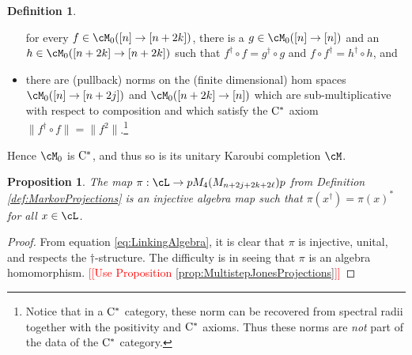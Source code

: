 \documentclass[11pt]{article}
\theoremstyle{plain}
\newtheorem{prop}[thm]{Proposition}
\theoremstyle{definition}
\newtheorem{defn}[thm]{Definition}
\newcommand{\Cstar}{\rm{C^*}}
\newcommand{\nn}[1]{\textcolor{red}{[[#1]]}}
\begin{document}
\begin{defn}
\begin{itemize}
for every $f\in \cM_0([n]\to [n+2k])$, there is a $g\in \cM_0([n] \to [n])$ and an $h\in \cM_0([n+2k]\to [n+2k])$ such that 
$f^\dag \circ f = g^\dag \circ g$ and $f\circ f^\dag = h^\dag \circ h$, and
\item
there are (pullback) norms on the (finite dimensional) hom spaces $\cM_0([n]\to [n+2j])$ and $\cM_0([n+2k] \to [n])$ which are sub-multiplicative with respect to composition and which satisfy the $\Cstar$ axiom $\|f^\dag \circ f \| = \|f^2\|$.\footnote{
Notice that in a $\Cstar$ category, these norm can be recovered from spectral radii together with the positivity and $\Cstar$ axioms.
Thus these norms are \emph{not} part of the data of the $\Cstar$ category.
}
\end{itemize}
Hence $\cM_0$ is $\Cstar$, and thus so is its unitary Karoubi completion $\cM$.
\end{defn}


\begin{prop}
\label{prop:InjectiveAlgebraMap}
The map $\pi: \cL \to pM_4(M_{n+2j+2k+2\ell})p$ from Definition \ref{def:MarkovProjections} is an injective algebra map such that $\pi(x^\dag) = \pi(x)^*$ for all $x\in \cL$.
\end{prop}
\begin{proof}
	From equation \ref{eq:LinkingAlgebra}, it is clear that $\pi$ is injective, unital, and respects the $\dag$-structure. The difficulty is in seeing that $\pi$ is an algebra homomorphism. 
\nn{Use Proposition \ref{prop:MultistepJonesProjections}}
\end{proof}
\end{document}

